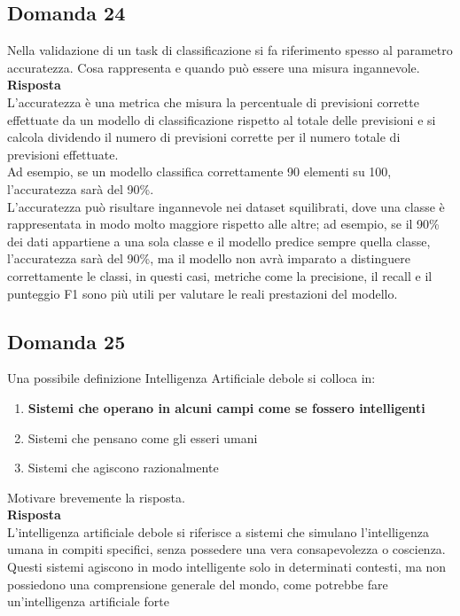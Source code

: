 \documentclass[../main.tex]{subfiles}
\begin{document}
	\subsection{Domanda 24}
	Nella validazione di un task di classificazione si fa riferimento spesso al parametro accuratezza. Cosa rappresenta e quando può essere una misura ingannevole.\\
	\textbf{Risposta}\\
	L'accuratezza è una metrica che misura la percentuale di previsioni corrette effettuate da un modello di classificazione rispetto al totale delle previsioni e si calcola dividendo il numero di previsioni corrette per il numero totale di previsioni effettuate.\\
	Ad esempio, se un modello classifica correttamente 90 elementi su 100, l'accuratezza sarà del 90\%.\\
	L'accuratezza può risultare ingannevole nei dataset squilibrati, dove una classe è rappresentata in modo molto maggiore rispetto alle altre; ad esempio, se il 90\% dei dati appartiene a una sola classe e il modello predice sempre quella classe, l'accuratezza sarà del 90\%, ma il modello non avrà imparato a distinguere correttamente le classi, in questi casi, metriche come la precisione, il recall e il punteggio F1 sono più utili per valutare le reali prestazioni del modello.
	\subsection{Domanda 25}
	Una possibile definizione Intelligenza Artificiale debole si colloca in: 
	\begin{enumerate}
		\item \textbf{Sistemi che operano in alcuni campi come se fossero intelligenti }
		\item Sistemi che pensano come gli esseri umani 
		\item Sistemi che agiscono razionalmente 
	\end{enumerate}
	Motivare brevemente la risposta.\\
	\textbf{Risposta}\\
	L'intelligenza artificiale debole si riferisce a sistemi che simulano l'intelligenza umana in compiti specifici, senza possedere una vera consapevolezza o coscienza. \\
	Questi sistemi agiscono in modo intelligente solo in determinati contesti, ma non possiedono una comprensione generale del mondo, come potrebbe fare un'intelligenza artificiale forte
\end{document}
